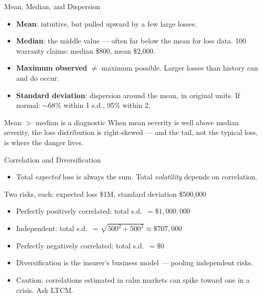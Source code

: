 \documentclass[11pt, aspectratio=169]{beamer}
\begin{document}
\begin{frame}{Mean, Median, and Dispersion}
\begin{itemize}
  \item \textbf{Mean}: intuitive, but pulled upward by a few large losses.
  \item \textbf{Median}: the middle value --- often far below the mean for loss data. 100 warranty claims: median \$800, mean \$2{,}000.
  \item \textbf{Maximum observed} $\neq$ maximum possible. Larger losses than history can and do occur.
  \item \textbf{Standard deviation}: dispersion around the mean, in original units. If normal: $\sim$68\% within 1 s.d., 95\% within 2.
\end{itemize}
\medskip
\begin{block}{Mean $>$ median is a diagnostic}
When mean severity is well above median severity, the loss distribution is \alert{right-skewed} --- and the tail, not the typical loss, is where the danger lives.
\end{block}
\end{frame}

\begin{frame}{Correlation and Diversification}
\begin{itemize}
  \item Total \emph{expected} loss is always the sum. Total \emph{volatility} depends on \alert{correlation}.
\end{itemize}
\begin{exampleblock}{Two risks, each: expected loss \$1M, standard deviation \$500{,}000}
\begin{itemize}
  \item Perfectly positively correlated: total s.d.\ $= \$1{,}000{,}000$
  \item Independent: total s.d.\ $= \sqrt{500^2 + 500^2} \approx \$707{,}000$
  \item Perfectly negatively correlated: total s.d.\ $= \$0$
\end{itemize}
\end{exampleblock}
\begin{itemize}
  \item Diversification is the insurer's business model --- pooling independent risks.
  \item Caution: correlations estimated in calm markets can \alert{spike toward one in a crisis}. Ask LTCM.
\end{itemize}
\end{frame}
\end{document}
